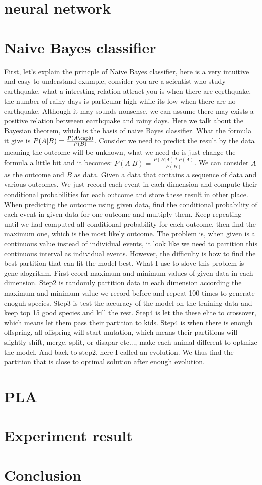 \documentclass[twocolumn,10pt]{article}
\begin{document}
\section{neural network}

\section{Naive Bayes classifier}
First, let's explain the princple of Naive Bayes classifier, here is a very intuitive and easy-to-understand example, consider you are a scientist who study earthquake, what a intresting relation attract you is when there are eqrthquake, the number of rainy days is particular high while its low when there are no earthquake. Although it may sounds nonsense, we can assume there may exists a positive relation betweeen earthquake and rainy days. Here we talk about the Bayesian theorem, which is the basis of naive Bayes classifier. What the formula it give is $P(A|B) = \frac{P(A\capB)}{P(B)}$. Consider we need to predict the result by the data meaning the outcome will be unknown, what we need do is just change the formula a little bit and it becomes: $P(A|B) = \frac{P(B|A)*P(A)}{P(B)}$. We can consider $A$ as the outcome and $B$ as data. Given a data that contains a sequence of data and various outcomes. We just record each event in each dimension and compute their conditional probabilities for each outcome and store these result in other place. When predicting the outcome using given data, find the conditional probability of each event in given data for one outcome and multiply them. Keep repeating until we had computed all conditional probability for each outcome, then find the maximum one, which is the most likely outcome. The problem is, when given is a continuous value instead of individual events, it look like we need to partition this continuous interval as individual events. However, the difficulty is how to find the best partition that can fit the model best. What I use to slove this problem is gene alogrithm. First ecord maximum and minimum values of given data in each dimension. Step2 is randomly partition data in each dimension according the maximum and minimum value we record before and repeat 100 times to generate enoguh species. Step3 is test the accuracy of the model on the training data and keep top 15 good species and kill the rest. Step4 is let the these elite to crossover, which means let them pass their partition to kids. Step4 is when there is enough offspring, all offspring will start mutation, which means their partitions will slightly shift, merge, split, or disapar etc..., make each animal different to optmize the model. And back to step2, here I called an evolution. We thus find the partition that is close to optimal solution after enough evolution.
\section{PLA}

\section{Experiment result}

\section{Conclusion}



\end{document}

